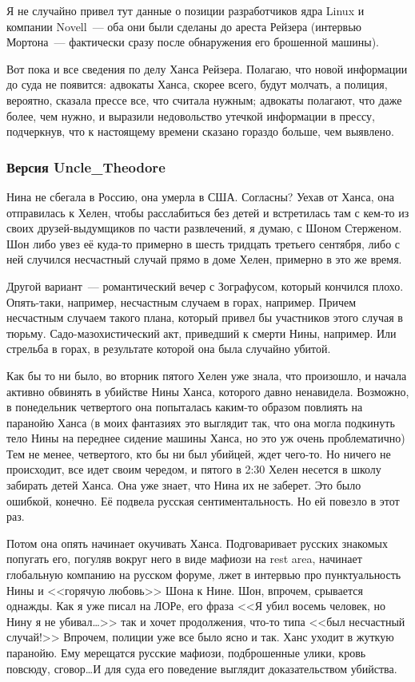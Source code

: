 Я не случайно привел тут данные о позиции разработчиков ядра Linux и компании Novell~--- оба они были сделаны до ареста Рейзера (интервью Мортона~--- фактически сразу после обнаружения его брошенной машины). 

Вот пока и все сведения по делу Ханса Рейзера. Полагаю, что новой информации до суда не появится: адвокаты Ханса, скорее всего, будут молчать, а полиция, вероятно, сказала прессе все, что считала нужным; адвокаты полагают, что даже более, чем нужно, и выразили недовольство утечкой информации в прессу, подчеркнув, что к настоящему времени сказано гораздо больше, чем выявлено. 

\subsubsection{Версия Uncle\_Theodore}

Нина не сбегала в Россию, она умерла в США. Согласны? Уехав от Ханса, она отправилась к Хелен, чтобы расслабиться без детей и встретилась там с кем-то из своих друзей-выдумщиков по части развлечений, я думаю, с Шоном Стерженом. Шон либо увез её куда-то примерно в шесть тридцать третьего сентября, либо с ней случился несчастный случай прямо в доме Хелен, примерно в это же время. 

Другой вариант~--- романтический вечер с Зографусом, который кончился плохо. Опять-таки, например, несчастным случаем в горах, например. Причем несчастным случаем такого плана, который привел бы участников этого случая в тюрьму. Садо-мазохистический акт, приведший к смерти Нины, например. Или стрельба в горах, в результате которой она была случайно убитой. 

Как бы то ни было, во вторник пятого Хелен уже знала, что произошло, и начала активно обвинять в убийстве Нины Ханса, которого давно ненавидела. Возможно, в понедельник четвертого она попыталась каким-то образом повлиять на паранойю Ханса (в моих фантазиях это выглядит так, что она могла подкинуть тело Нины на переднее сидение машины Ханса, но это уж очень проблематично) Тем не менее, четвертого, кто бы ни был убийцей, ждет чего-то. Но ничего не происходит, все идет своим чередом, и пятого в 2:30 Хелен несется в школу забирать детей Ханса. Она уже знает, что Нина их не заберет. Это было ошибкой, конечно. Её подвела русская сентиментальность. Но ей повезло в этот раз. 

Потом она опять начинает окучивать Ханса. Подговаривает русских знакомых попугать его, погуляв вокруг него в виде мафиози на rest area, начинает глобальную компанию на русском форуме, лжет в интервью про пунктуальность Нины и <<горячую любовь>> Шона к Нине. Шон, впрочем, срывается однажды. Как я уже писал на ЛОРе, его фраза <<Я убил восемь человек, но Нину я не убивал\dots>> так и хочет продолжения, что-то типа << был несчастный случай!>> Впрочем, полиции уже все было ясно и так. Ханс уходит в жуткую паранойю. Ему мерещатся русские мафиози, подброшенные улики, кровь повсюду, сговор\dots И для суда его поведение выглядит доказательством убийства. 

